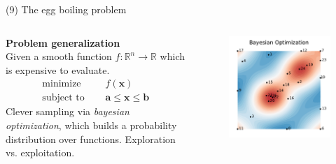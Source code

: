 \documentclass[11pt, aspectratio=149]{beamer}
\theoremstyle{plain}
\begin{document}
\begin{frame}[fragile, t]{(9) The egg boiling problem}
	\begin{columns}
		\begin{column}{0.55\textwidth}
			\textbf{Problem generalization}
			\\
			\vspace*{0.5em} 
			Given a smooth function $f: \mathbb{R}^n \to \mathbb{R}$ which is expensive to evaluate.
			\begin{align*}
			\text{minimize } \quad & f(\mathbf{x}) \\
			\text{subject to } \quad & \mathbf{a} \leq \mathbf{x} \leq \mathbf{b} 
			\end{align*}
			\vfill
			Clever sampling via \emph{bayesian optimization}, which builds a probability distribution over functions.
			Exploration vs. exploitation.
		\end{column}
		\begin{column}{0.45\textwidth}%
			\begin{figure}
				\centering
				\includegraphics[width=1.05\linewidth]{figs/bayes_opt.pdf}
			\end{figure}
		\end{column}
	\end{columns}
\end{frame}
\end{document}
